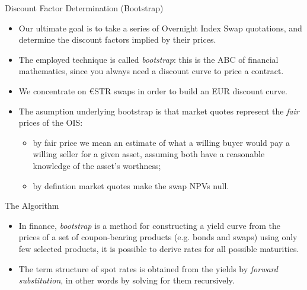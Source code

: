 \documentclass{beamer}
\begin{document}
%        
% 
% 
%
%
%
%
%

\begin{frame}{Discount Factor Determination (Bootstrap)}
\begin{itemize}
\item Our ultimate goal is to take a series of Overnight Index Swap quotations, and determine the discount factors implied by their prices. 
\item The employed technique is called \emph{bootstrap}: this is the ABC of financial mathematics, since you always need a discount curve to price a contract.
\item We concentrate on €STR swaps in order to build an EUR discount curve.
\item The asumption underlying bootstrap is that market quotes represent the \emph{fair} prices of the OIS:
\begin{itemize}
  \item by fair price we mean an estimate of what a willing buyer would pay a willing seller for a given asset, assuming both have a reasonable knowledge of the asset's worthness;
  \item by defintion market quotes make the swap NPVs null.
  \end{itemize}
  \end{itemize}
\end{frame}  
  
\begin{frame}{The Algorithm}
\begin{itemize} 
\item In finance, \emph{bootstrap} is a method for constructing a yield curve from the prices of a set of coupon-bearing products (e.g. bonds and swaps) using only few selected products, it is possible to derive rates for all possible maturities.
\item The term structure of spot rates is obtained from the yields by \emph{forward substitution}, in other words by solving for them recursively. 
\end{itemize}
\end{frame} 
\end{document}
